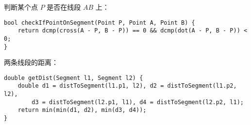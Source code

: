 判断某个点 $P$ 是否在线段 $AB$ 上：

\begin{verbatim}
bool checkIfPointOnSegment(Point P, Point A, Point B) {
    return dcmp(cross(A - P, B - P)) == 0 && dcmp(dot(A - P, B - P)) < 0;
}
\end{verbatim}

两条线段的距离：

\begin{verbatim}
double getDist(Segment l1, Segment l2) {
    double d1 = distToSegment(l1.p1, l2), d2 = distToSegment(l1.p2, l2),
        d3 = distToSegment(l2.p1, l1), d4 = distToSegment(l2.p2, l1);
    return min(min(d1, d2), min(d3, d4));
}
\end{verbatim}
